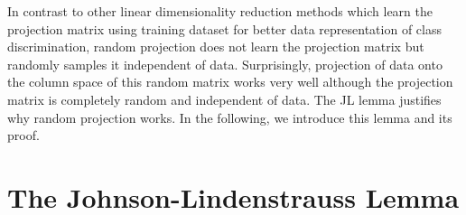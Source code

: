 \documentclass{article}
\begin{document}
In contrast to other linear dimensionality reduction methods which learn the projection matrix using training dataset for better data representation of class discrimination, random projection does not learn the projection matrix but randomly samples it independent of data.  
Surprisingly, projection of data onto the column space of this random matrix works very well although the projection matrix is completely random and independent of data. 
The JL lemma \cite{johnson1984extensions} justifies why random projection works. In the following, we introduce this lemma and its proof. 

\section{The Johnson-Lindenstrauss Lemma}\label{section_JL_lemma}

\end{document}
